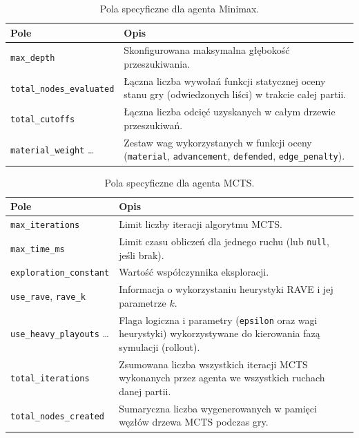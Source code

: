 \documentclass{article}
\begin{document}
\begin{table}[H]
    \centering
    \caption{Pola specyficzne dla agenta Minimax.}
    \label{tab:out-minimax}
    \renewcommand{\arraystretch}{1.2}
    \begin{tabularx}{\textwidth}{|l|X|}
        \hline
        \textbf{Pole} & \textbf{Opis} \\
        \hline
        \texttt{max\_depth} & Skonfigurowana maksymalna głębokość przeszukiwania. \\
        \texttt{total\_nodes\_evaluated} & Łączna liczba wywołań funkcji statycznej oceny stanu gry (odwiedzonych liści) w trakcie całej partii. \\
        \texttt{total\_cutoffs} & Łączna liczba odcięć uzyskanych w całym drzewie przeszukiwań. \\
        \texttt{material\_weight} \dots & Zestaw wag wykorzystanych w funkcji oceny (\texttt{material}, \texttt{advancement}, \texttt{defended}, \texttt{edge\_penalty}). \\
        \hline
    \end{tabularx}
\end{table}

\begin{table}[H]
    \centering
    \caption{Pola specyficzne dla agenta MCTS.}
    \label{tab:out-mcts}
    \renewcommand{\arraystretch}{1.2}
    \begin{tabularx}{\textwidth}{|l|X|}
        \hline
        \textbf{Pole} & \textbf{Opis} \\
        \hline
        \texttt{max\_iterations} & Limit liczby iteracji algorytmu MCTS. \\
        \texttt{max\_time\_ms} & Limit czasu obliczeń dla jednego ruchu (lub \texttt{null}, jeśli brak). \\
        \texttt{exploration\_constant} & Wartość współczynnika eksploracji. \\
        \texttt{use\_rave}, \texttt{rave\_k} & Informacja o wykorzystaniu heurystyki RAVE i jej parametrze $k$. \\
        \texttt{use\_heavy\_playouts} \dots & Flaga logiczna i parametry (\texttt{epsilon} oraz wagi heurystyki) wykorzystywane do kierowania fazą symulacji (rollout). \\
        \texttt{total\_iterations} & Zsumowana liczba wszystkich iteracji MCTS wykonanych przez agenta we wszystkich ruchach danej partii. \\
        \texttt{total\_nodes\_created} & Sumaryczna liczba wygenerowanych w pamięci węzłów drzewa MCTS podczas gry. \\
        \hline
    \end{tabularx}
\end{table}
\end{document}
